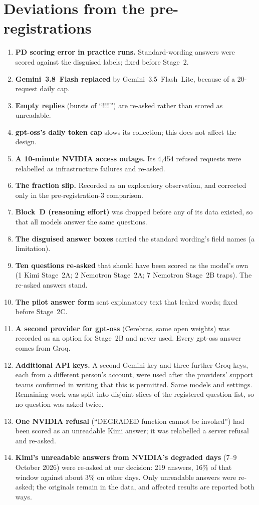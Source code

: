 \documentclass[10pt]{article}
\theoremstyle{definition}
\theoremstyle{remark}
\begin{document}
\section{Deviations from the pre-registrations}\label{app:deviations}
\begin{enumerate}
\item \textbf{PD scoring error in practice runs.} Standard-wording answers were scored against the disguised
  labels; fixed before Stage~2.
\item \textbf{Gemini~3.8~Flash replaced} by Gemini~3.5~Flash~Lite, because of a 20-request
  daily cap.
\item \textbf{Empty replies} (bursts of ``!!!!'') are re-asked rather than scored as unreadable.
\item \textbf{gpt-oss's daily token cap} slows its collection; this does not affect the design.
\item \textbf{A 10-minute NVIDIA access outage.} Its 4{,}454 refused requests were relabelled as
  infrastructure failures and re-asked.
\item \textbf{The fraction slip.} Recorded as an exploratory observation, and corrected only in
  the pre-registration-3 comparison.
\item \textbf{Block~D (reasoning effort)} was dropped before any of its data existed, so that all
  models answer the same questions.
\item \textbf{The disguised answer boxes} carried the standard wording's field names (a limitation).
\item \textbf{Ten questions re-asked} that should have been scored as the model's own (1 Kimi
  Stage~2A; 2 Nemotron Stage~2A; 7 Nemotron Stage~2B traps). The re-asked answers stand.
\item \textbf{The pilot answer form} sent explanatory text that leaked words; fixed before
  Stage~2C.
\item \textbf{A second provider for gpt-oss} (Cerebras, same open weights) was recorded as an option
  for Stage~2B and never used. Every gpt-oss answer comes from Groq.
\item \textbf{Additional API keys.} A second Gemini key and three further Groq keys, each from a
  different person's account, were used after the providers' support teams confirmed in writing
  that this is permitted. Same models and settings. Remaining work was split into disjoint
  slices of the registered question list, so no question was asked twice.
\item \textbf{One NVIDIA refusal} (``DEGRADED function cannot be invoked'') had been scored as an
  unreadable Kimi answer; it was relabelled a server refusal and re-asked.
\item \textbf{Kimi's unreadable answers from NVIDIA's degraded days} (7--9 October 2026) were
  re-asked at our decision: 219 answers, 16\% of that window against about 3\% on other
  days. Only unreadable answers were re-asked; the originals remain in the data, and affected
  results are reported both ways.
\end{enumerate}
\end{document}
